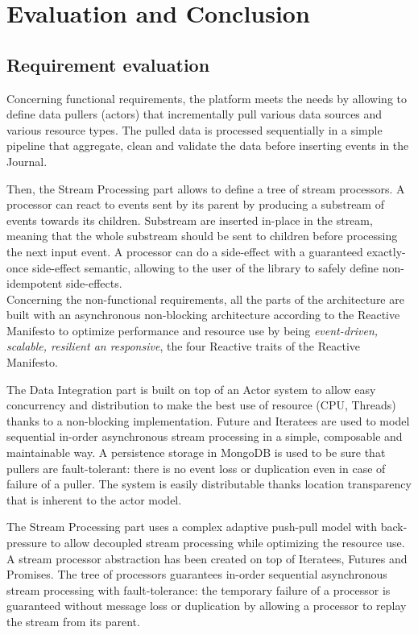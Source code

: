 \chapter{Evaluation and Conclusion}

\section{Requirement evaluation}

Concerning functional requirements, the platform meets the needs by allowing to define data pullers (actors) that incrementally pull various data sources and various resource types.
The pulled data is processed sequentially in a simple pipeline that aggregate, clean and validate the data before inserting events in the Journal.

Then, the Stream Processing part allows to define a tree of stream processors. A processor can react to events sent by its parent by producing a substream of events towards its children. Substream are inserted in-place in the stream, meaning that the whole substream should be sent to children before processing the next input event. A processor can do a side-effect with a guaranteed exactly-once side-effect semantic, allowing to the user of the library to safely define non-idempotent side-effects.
\\

Concerning the non-functional requirements, all the parts of the architecture are built with an asynchronous non-blocking architecture according to the Reactive Manifesto 
 to optimize performance and resource use by being \textit{event-driven, scalable, resilient an responsive}, the four Reactive traits of the Reactive Manifesto.

The Data Integration part is built on top of an Actor system to allow easy concurrency and distribution to make the best use of resource (CPU, Threads) thanks to a non-blocking implementation. Future and Iteratees are used to model sequential in-order asynchronous stream processing in a simple, composable and maintainable way. A persistence storage
in MongoDB is used to be sure that pullers are fault-tolerant: there is no event loss or duplication even in case of failure of a puller. The system is easily distributable 
thanks location transparency that is inherent to the actor model.

The Stream Processing part uses a complex adaptive push-pull model with back-pressure to allow decoupled stream processing while optimizing the resource use. A stream processor abstraction has been created on top of Iteratees, Futures and Promises. The tree of processors guarantees in-order sequential asynchronous stream processing with fault-tolerance: the temporary failure of a processor is guaranteed without message loss or duplication by allowing a processor to replay the stream from its parent.
\\


